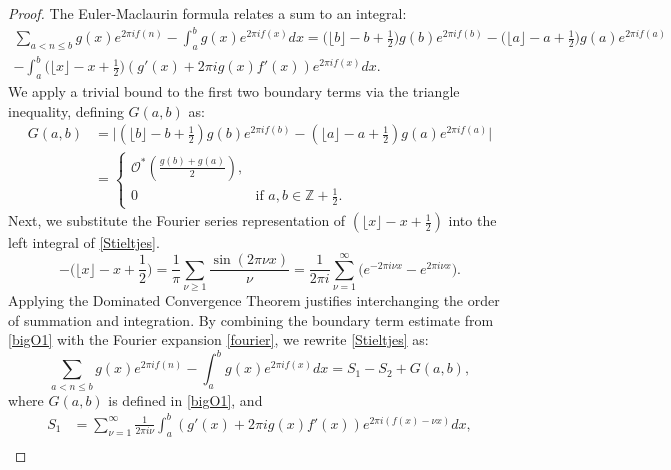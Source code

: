 \documentclass[11pt,letterpaper,oneside,reqno]{amsart}
\renewcommand{\^}[1]{\widehat{#1}}
\numberwithin{equation}{section}
\theoremstyle{remark}
\begin{document}
\begin{proof}
\smallskip
The Euler-Maclaurin formula relates a sum to an integral:
\begin{multline}
\label{Stieltjes}
    \sum_{a<n \leq b}g(x) e^{2\pi i f(n)} - \int_{a}^{b} g(x)e^{2\pi i f(x)} dx  =\bigg(\lfloor b \rfloor - b + \frac{1}{2}\bigg)g(b)e^{2\pi i f(b)} - \bigg(\lfloor a \rfloor - a + \frac{1}{2}\bigg)g(a)e^{2\pi i f(a)} \\
    -\int_{a}^{b} \bigg(\lfloor x \rfloor - x + \frac{1}{2}\bigg)(g'(x)+2\pi i g(x)f'(x))e^{2\pi i f(x)} dx.
\end{multline}
%
We apply a trivial bound to the first two boundary terms via the triangle inequality, defining $G(a,b)$ as:
\begin{equation}\label{bigO1}
\begin{split}
G(a,b) &= \bigg| \left(\lfloor b \rfloor - b + \frac{1}{2}\right)g(b)e^{2\pi i f(b)} - \left(\lfloor a \rfloor - a + \frac{1}{2}\right)g(a)e^{2\pi i f(a)}\bigg|  \\
&= \begin{cases}
\mathcal{O}^*\left( \frac{g(b)+ g(a)}{2} \right), & \\ 
0 & \text{if } a,b \in \mathbb{Z}+\frac{1}{2}.
\end{cases}
\end{split}
\end{equation}
Next, we substitute the Fourier series representation of $( \lfloor x \rfloor - x + \frac{1}{2}  )$ into the left integral of \eqref{Stieltjes}. 
\begin{equation}
- \Big( \lfloor x \rfloor - x + \frac{1}{2} \Big)=  \frac{1}{\pi} \sum_{\nu \ge1} \frac{\sin(2\pi \nu x)}{\nu } = \frac1{2\pi i}\sum _{\nu =1}^{\infty}\big(e^{-2\pi i\nu x}
    - e^{2\pi i\nu x}\big) .\label{fourier}
 \end{equation}
 Applying the Dominated Convergence Theorem justifies interchanging the order of summation and integration. By combining the boundary term estimate from \eqref{bigO1} with the Fourier expansion \eqref{fourier}, we rewrite \eqref{Stieltjes} as:
    \begin{equation}
    \label{eqn-exp}
        \sum_{a<n \leq b}g(x) e^{2\pi i f(n)} - \int_{a}^{b} g(x)e^{2\pi i f(x)} dx 
        = S_1-S_2 +G(a,b), 
    \end{equation}
    where $G(
    a,b)$ is defined in \eqref{bigO1}, and 
\begin{align}
    S_1 & =\sum_{\nu=1}^{\infty}\frac{1}{2\pi i \nu}\int_a^b\left(g
    '(x)+2\pi ig(x)f'(x)\right)e^{2\pi i\left(f(x)-\nu x\right)}dx,\label{def-S1}\\

\end{align}
\end{proof}
\end{document}
